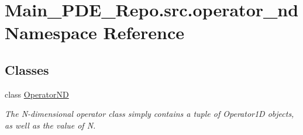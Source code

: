 \hypertarget{namespaceMain__PDE__Repo_1_1src_1_1operator__nd}{}\section{Main\+\_\+\+P\+D\+E\+\_\+\+Repo.\+src.\+operator\+\_\+nd Namespace Reference}
\label{namespaceMain__PDE__Repo_1_1src_1_1operator__nd}
\subsection*{Classes}
\begin{DoxyCompactItemize}
\item 
class \hyperlink{classMain__PDE__Repo_1_1src_1_1operator__nd_1_1OperatorND}{Operator\+ND}
\begin{DoxyCompactList}\small\item\em The N-\/dimensional operator class simply contains a tuple of Operator1D objects, as well as the value of N. \end{DoxyCompactList}\end{DoxyCompactItemize}
